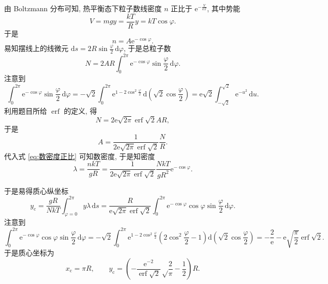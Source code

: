 \documentclass{article}
\begin{document}
由 Boltzmann 分布可知, 热平衡态下粒子数线密度 $n$ 正比于 $\mathrm e^{-\frac V{kT}}$,
其中势能
\begin{equation}
	V=mgy=\frac{kT}{R}y=kT\cos\varphi.
\end{equation}
于是
\begin{equation}
	\label{eq:数密度正比}
	n=A\mathrm e^{-\cos\varphi}.
\end{equation}
易知摆线上的线微元 $\mathrm ds=2R\sin\frac\varphi2\,\mathrm d\varphi$,
于是总粒子数
\begin{equation}
	N=2AR\int_0^{2\pi}\mathrm e^{-\cos\varphi}\sin\frac\varphi2\,\mathrm d\varphi.
\end{equation}
注意到
\begin{equation}
	\int_0^{2\pi}\mathrm e^{-\cos\varphi}\sin\frac\varphi2\,\mathrm d\varphi
	=-\sqrt2\int_0^{2\pi}\mathrm e^{1-2\cos^2\frac\varphi2}\,\mathrm d\!\left(\sqrt2\cos\frac\varphi2\right)
	=\mathrm e\sqrt2\int_{-\sqrt2}^{\sqrt2}\mathrm e^{-u^2}\,\mathrm du.
\end{equation}
利用题目所给 $\operatorname{erf}$ 的定义, 得
\begin{equation}
	N=2\mathrm e\sqrt{2\pi}\operatorname{erf}\sqrt2AR,
\end{equation}
于是
\begin{equation}
	A=\frac1{2\mathrm e\sqrt{2\pi}\operatorname{erf}\sqrt2}\frac NR.
\end{equation}
代入式 \ref{eq:数密度正比} 可知数密度, 于是知密度
\begin{equation}
	\lambda=\frac{nkT}{gR}=\frac1{2\mathrm e\sqrt{2\pi}\operatorname{erf}\sqrt2}\frac{NkT}{gR^2}\mathrm e^{-\cos\varphi}.
\end{equation}

于是易得质心纵坐标
\begin{equation}
	y_\mathrm c=\frac{gR}{NkT}\int_{\varphi=0}^{2\pi}y\lambda\,\mathrm ds=\frac R{\mathrm e\sqrt{2\pi}\operatorname{erf}\sqrt2}\int_0^{2\pi}\mathrm e^{-\cos\varphi}\cos\varphi\sin\frac\varphi2\,\mathrm d\varphi.
\end{equation}
注意到
\begin{equation}
	\int_0^{2\pi}\mathrm e^{-\cos\varphi}\cos\varphi\sin\frac\varphi2\,\mathrm d\varphi
	=-\sqrt2\int_0^{2\pi}\mathrm e^{1-2\cos^2\frac\varphi2}\left(2\cos^2\frac\varphi2-1\right)\mathrm d\!\left(\sqrt2\cos\frac\varphi2\right)=-\frac2{\mathrm e}-\mathrm e\sqrt{\frac\pi2}\operatorname{erf}\sqrt2.
\end{equation}
于是质心坐标为
\begin{equation}
	x_\mathrm c=\pi R,\qquad
	y_\mathrm c=\left(-\frac{\mathrm e^{-2}}{\operatorname{erf}\sqrt2}\sqrt\frac2\pi-\frac12\right)R.
\end{equation}
\end{document}
